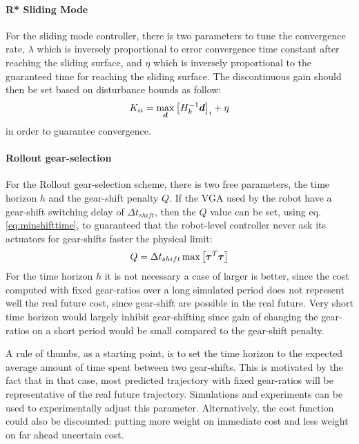\paragraph{R* Sliding Mode} For the sliding mode controller, there is two parameters to tune the convergence rate, $\lambda$ which is inversely proportional to error convergence time constant after reaching the sliding surface, and $\eta$ which is inversely proportional to the guaranteed time for reaching the sliding surface. The discontinuous gain should then be set based on disturbance bounds as follow:
%
\begin{align}
K_{ii} = \operatornamewithlimits{max}\limits_{\vec{d}} \left[ H_k^{-1} \vec{d} \right]_i + \eta
\end{align}
%
in order to guarantee convergence.

\paragraph{Rollout gear-selection}
%
For the Rollout gear-selection scheme, there is two free parameters, the time horizon $h$ and the gear-shift penalty $Q$. If the VGA used by the robot have a gear-shift switching delay of $\Delta t_{shift}$, then the $Q$ value can be set, using eq. \eqref{eq:minshifttime}, to guaranteed that the robot-level controller never ask its actuators for gear-shifts faster the physical limit:
%
\begin{align}
Q = \Delta t_{shift} \operatornamewithlimits{max} \left[ \vec{\tau}^T \vec{\tau} \right]
\end{align}
%
For the time horizon $h$ it is not necessary a case of larger is better, since the cost computed with fixed gear-ratios over a long simulated period does not represent well the real future cost, since gear-shift are possible in the real future. Very short time horizon would largely inhibit gear-shifting since gain of changing the gear-ratios on a short period would be small compared to the gear-shift penalty. 

A rule of thumbs, as a starting point, is to set the time horizon to the expected average amount of time spent between two gear-shifts. This is motivated by the fact that in that case, most predicted trajectory with fixed gear-ratios will be representative of the real future trajectory. Simulations and experiments can be used to experimentally adjust this parameter. Alternatively, the cost function could also be discounted: putting more weight on immediate cost and less weight on far ahead uncertain cost. 




